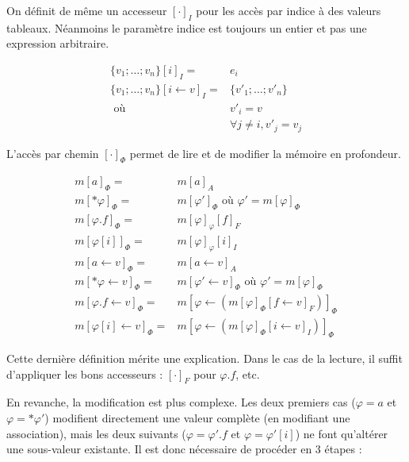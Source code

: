 \begin{definition}

  On définit de même un accesseur $[\cdot]_I$ pour les accès par indice à des
  valeurs tableaux. Néanmoins le paramètre indice est toujours un entier et pas
  une expression arbitraire.

  \begin{align*}
    \{ v_1 ; … ; v_n \} [i]_I   = & e_i \\
    \{ v_1 ; … ; v_n \} [i←v]_I = & \{ v'_1 ; … ; v'_n \} \\
                      \mbox{ où } & v'_i = v \\
                                  & ∀j≠i, v'_j = v_j
  \end{align*}

\end{definition}

\begin{definition}

  L'accès par chemin $[\cdot]_Φ$ permet de lire et de modifier la mémoire en
  profondeur.

  \begin{align*}
    m[a]_Φ        = & m[a]_A \\
    m[*φ]_Φ       = & m[φ']_Φ \mbox{ où } φ' = m[φ]_Φ \\
    m[φ.f]_Φ      = & m[φ]_φ[f]_F \\
    m[φ[i]]_Φ     = & m[φ]_φ[i]_I \\
    m[a ← v]_Φ    = & m[a ← v]_A \\
    m[*φ ← v]_Φ   = & m[φ' ← v]_Φ \mbox{ où } φ' = m[φ]_Φ \\
    m[φ.f ← v]_Φ  = & m[φ ← (m[φ]_Φ[f←v]_F)]_Φ \\
    m[φ[i] ← v]_Φ = & m[φ ← (m[φ]_Φ[i←v]_I)]_Φ
  \end{align*}

\end{definition}

Cette dernière définition mérite une explication. Dans le cas de la lecture, il
suffit d'appliquer les bons accesseurs : $[\cdot]_F$ pour $φ.f$, etc.

En revanche, la modification est plus complexe. Les deux premiers cas ($φ = a$
et $φ = *φ'$) modifient directement une valeur complète (en modifiant une
association), mais les deux suivants ($φ = φ'.f$ et $φ = φ'[i]$) ne font
qu'altérer une sous-valeur existante. Il est donc nécessaire de procéder en 3
étapes :

